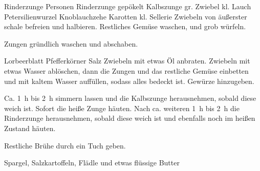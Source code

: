 \begin{MyRecipe}{Rinderzunge}{ Personen}{}
	\ingredient[\Calc{1}{\x}]{} {Rinderzunge gepökelt}
	\ingredient[\Calc{1}{\x}]{} {Kalbszunge}
	\ingredient[\Calc{1}{\x}]{} {gr. Zwiebel}
	\ingredient[\Calc{1}{\x}]{} {kl. Lauch}
	\ingredient[\Calc{1}{\x}]{} {Petersilienwurzel}
	\ingredient[\Calc{1}{\x}]{} {Knoblauchzehe}
	\ingredient[\Calc{2}{\x}]{} {Karotten}
	\ingredient[\Calc{0.5}{\x}]{} {kl. Sellerie}
	Zwiebeln von äußerster schale befreien und halbieren. Restliches Gemüse waschen, und grob würfeln.

	Zungen gründlich waschen und abschaben.\par\bigskip
	
	\ingredient[\Calc{1}{\x}]{} {Lorbeerblatt}
	 {Pfefferkörner}
	 {Salz}
	Zwiebeln mit etwas Öl anbraten. Zwiebeln mit etwas Wasser ablöschen, dann die Zungen und das restliche Gemüse einbetten und mit kaltem Wasser auffüllen, sodass alles bedeckt ist.
	Gewürze hinzugeben.\par\bigskip
	
	Ca. \SI{1}{\hour} bis \SI{2}{\hour} simmern lassen und die Kalbszunge herausnehmen, sobald diese weich ist. Sofort die heiße Zunge häuten. Nach ca. weiteren \SI{1}{\hour} bis \SI{2}{\hour} die Rinderzunge herausnehmen, sobald diese weich ist und ebenfalls noch im heißen Zustand häuten.

	Restliche Brühe durch ein Tuch geben.\par\bigskip

	Spargel, Salzkartoffeln, Flädle und etwas flüssige Butter
	

	
	
	
\end{MyRecipe}